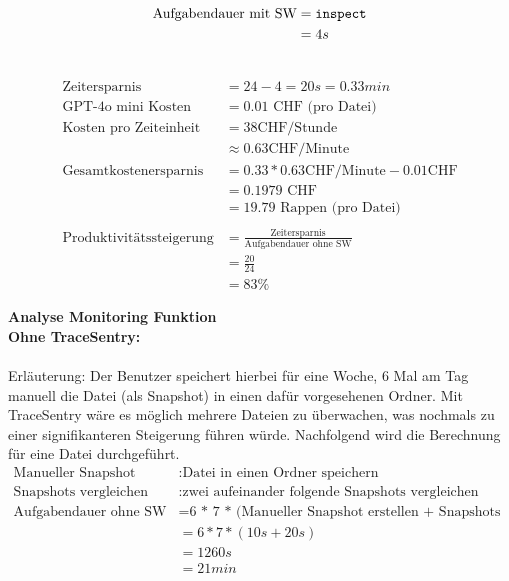 \documentclass[a4paper,12pt]{report}
\begin{document}
     \\
    \begin{align*}
        \text{Aufgabendauer mit SW} &= \text{\texttt{inspect}} \\
        &= 4s
    \end{align*}

     \\
    \begin{align*}
        \text{Zeitersparnis} &= 24 - 4 = 20s = 0.33min \\
        \text{GPT-4o mini Kosten} &= 0.01 \text{ CHF (pro Datei)} \\
        \text{Kosten pro Zeiteinheit} &= 38 \text{CHF/Stunde} \\ &\approx 0.63 \text{CHF/Minute} \\
        \text{Gesamtkostenersparnis} &= 0.33 * 0.63 \text{CHF/Minute} - 0.01 \text{CHF} \\ &= 0.1979 \text{ CHF} \\ &= 19.79 \text{ Rappen (pro Datei)} \\
        \\
        \text{Produktivitätssteigerung} &= \frac{\text{Zeitersparnis}}{\text{Aufgabendauer ohne SW}}
        \\ &= \frac{\text{20}}{\text{24}}
        \\ &= 83\%
    \end{align*}

    \newpage

    \textbf{Analyse Monitoring Funktion} \\

    \textbf{Ohne TraceSentry:} \\
    \\

    Erläuterung: Der Benutzer speichert hierbei für eine Woche, 6 Mal am Tag manuell die Datei (als Snapshot) in einen dafür vorgesehenen Ordner.
    Mit TraceSentry wäre es möglich mehrere Dateien zu überwachen, was nochmals zu einer signifikanteren Steigerung führen würde.
    Nachfolgend wird die Berechnung für eine Datei durchgeführt.
    \begin{align*}
        \text{Manueller Snapshot erstellen}&: \text{Datei in einen Ordner speichern}\\
        \text{Snapshots vergleichen}&: \text{zwei aufeinander folgende Snapshots vergleichen} \\
        \text{Aufgabendauer ohne SW} &= \text{6 * 7 * (Manueller Snapshot erstellen + Snapshots vergleichen)} \\
        &= 6 * 7 * (10s + 20s) \\
        &= 1260s \\
        &= 21min \\
    \end{align*}
\end{document}
